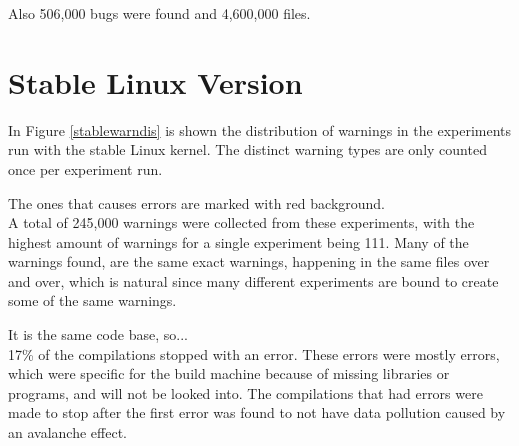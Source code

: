 \documentclass[a4paper,11pt]{report}
\begin{document}
Also 506,000 bugs were found and 4,600,000 files.
\\


            \section{Stable Linux Version}
In Figure \ref{stablewarndis} is shown the distribution of warnings in the 
experiments run with the stable Linux kernel. The distinct warning types are 
only counted once per experiment run.

The ones that causes errors are marked with red background.
\\

A total of 245,000 warnings were collected from these experiments, with the 
highest amount of warnings for a single experiment being 111.  Many of the 
warnings found, are the same exact warnings, happening in the same files over 
and over, which is natural since many different experiments are bound to create 
some of the same warnings.

It is the same code base, so...
\\

17\% of the compilations stopped with an error. These errors were mostly 
errors, which were specific for the build machine because of missing libraries 
or programs, and will not be looked into.  The compilations that had errors 
were made to stop after the first error was found to not have data pollution 
caused by an avalanche effect.
\\


\end{document}
